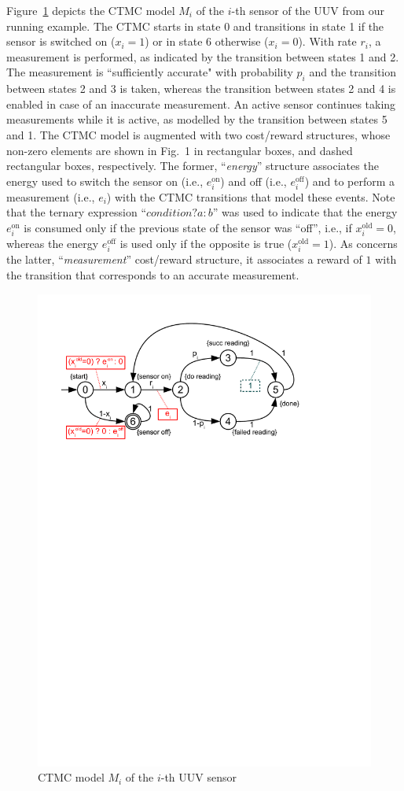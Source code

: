 \begin{example}
Figure~\ref{fig:model} depicts the CTMC model $M_i$ of the $i$-th sensor of the UUV from our running example. The CTMC starts in state 0 and transitions in state 1 if the sensor is switched on ($x_i=1$) or in state 6 otherwise ($x_i=0$). With rate $r_i$,  a measurement is performed, as indicated by the transition between states 1 and 2. The measurement is ``sufficiently accurate" with probability $p_i$ and the transition between states 2 and 3 is taken, whereas the transition between states 2 and 4 is enabled in case of an inaccurate measurement. An active sensor continues taking measurements while it is active,  as modelled by the transition between states 5 and 1. The CTMC model is augmented with two cost/reward structures, whose non-zero elements are shown in Fig.~1 in rectangular boxes, and dashed rectangular boxes, respectively. The former, ``\textit{energy}'' structure associates the energy used to switch the sensor on (i.e., $e_i^\mathrm{on}$) and off (i.e., $e_i^\mathrm{off}$) and to perform a measurement (i.e., $e_i$) with the CTMC transitions that model these events. Note that the ternary expression ``$\mathit{condition}?a\!:\!b$'' was used to indicate that the energy $e_i^\mathrm{on}$ is consumed only if the previous state of the sensor was ``off'', i.e., if $x_i^\mathrm{old}=0$, whereas the energy $e_i^\mathrm{off}$ is used  only if the opposite is true ($x_i^\mathrm{old}=1$). As concerns the latter, ``\textit{measurement}'' cost/reward structure, it associates a reward of $1$ with the transition that corresponds to an accurate measurement. 
\end{example}

\begin{figure}[t]
\centering 
\includegraphics[trim = 17mm 205mm 45mm 17mm, clip, width=0.7\linewidth]{figures/model.pdf}
\caption{CTMC model $M_i$ of the $i$-th UUV sensor}
\label{fig:model}

\vspace*{-2mm}
\end{figure}